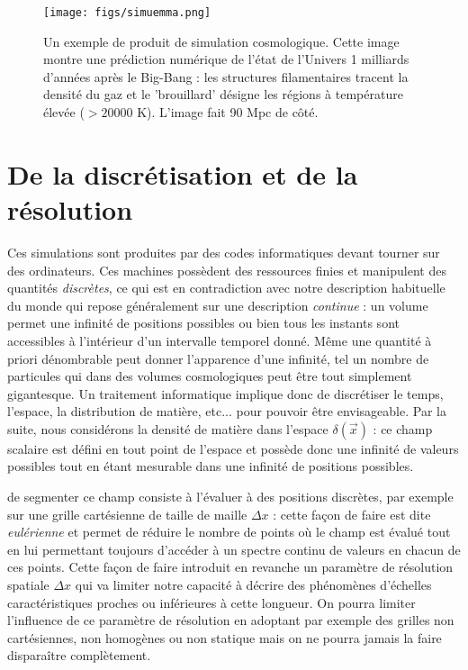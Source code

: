 \begin{figure}[htbp]
	\centering
		\texttt{[image: figs/simuemma.png]}
	\caption[Un exemple de produit de simulation cosmologique]{Un exemple de produit de simulation cosmologique. Cette image montre une prédiction numérique de l'état de l'Univers 1 milliards d'années après le Big-Bang : les structures filamentaires tracent la densité du gaz et le 'brouillard' désigne les régions à température élevée ($>20000$ K). L'image fait 90 Mpc de côté.}
	\label{f:simuemma}
\end{figure}

\section{De la discrétisation et de la résolution}
Ces simulations sont produites par des codes informatiques devant tourner sur des ordinateurs. Ces machines possèdent des ressources finies et manipulent des quantités \textit{discrètes}, ce qui est en contradiction avec notre description habituelle du monde qui repose généralement sur une description \textit{continue} : un volume permet une infinité de positions possibles ou bien tous les instants sont accessibles à l'intérieur d'un intervalle temporel donné. Même une quantité à priori dénombrable peut donner l'apparence d'une infinité, tel un nombre de particules qui dans des volumes cosmologiques peut être tout simplement gigantesque. Un traitement informatique implique donc de discrétiser le temps, l'espace, la distribution de matière, etc... pour pouvoir être envisageable.
Par la suite, nous considérons la densité de matière dans l'espace $\delta(\vec x)$ : ce champ scalaire est défini en tout point de l'espace et possède donc une infinité de valeurs possibles tout en étant mesurable dans une infinité de positions possibles. 

 de segmenter ce champ consiste à l'évaluer à des positions discrètes, par exemple sur une grille cartésienne de taille de maille $\Delta x$ : cette façon de faire est dite \textit{eulérienne} et permet de réduire le nombre de points où le champ est évalué tout en lui permettant toujours d'accéder à un spectre continu de valeurs en chacun de ces points. Cette façon de faire introduit en revanche un paramètre de résolution spatiale $\Delta x$ qui va limiter notre capacité à décrire des phénomènes d'échelles caractéristiques proches ou inférieures à cette longueur. On pourra limiter l'influence de ce paramètre de résolution en adoptant par exemple des grilles non cartésiennes, non homogènes ou non statique mais on ne pourra jamais la faire disparaître complètement.

